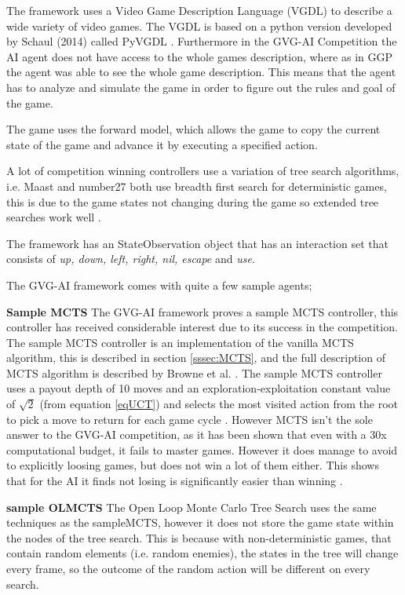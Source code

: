 \documentclass[journal]{IEEEtran}
\begin{document}
		
		The framework uses a Video Game Description Language (VGDL) to describe a wide variety of video games. The VGDL is based on a python version developed by Schaul (2014) called PyVGDL \cite{schuster2015mcts}. Furthermore in the GVG-AI Competition the AI agent does not have access to the whole games description, where as in GGP the agent was able to see the whole game description. This means that the agent has to analyze and simulate the game in order to figure out the rules and goal of the game.

The game uses the forward model, which allows the game to copy the current state of the game and advance it by executing a specified action.

A lot of competition winning controllers use a variation of tree search algorithms, i.e. Maast and number27  \cite{schuster2015mcts} both use breadth first search for deterministic games, this is due to the game states not changing during the game so extended tree searches work well \cite{perez2018general}.
		
		The framework has an StateObservation object that has an interaction set that consists of \textit{up, down, left, right, nil, escape} and \textit{use}.

		The GVG-AI framework comes with quite a few sample agents;
		
		\textbf{Sample MCTS} \label{sssec:sampleMCTS}
			The GVG-AI framework proves a sample MCTS controller, this controller has received considerable interest due to its success in the competition. 
			The sample MCTS controller is an implementation of the vanilla MCTS algorithm, this is described in section \ref{sssec:MCTS}, and the full description of MCTS algorithm is described by Browne et al. \cite{browne2012survey}.
			The sample MCTS controller uses a payout depth of 10 moves and an exploration-exploitation constant value of $\sqrt{2}$ (from equation \ref{eqUCT}) and selects the most visited action from the root to pick a move to return for each game cycle \cite{perez20162014}.
			However MCTS isn't the sole answer to the GVG-AI competition, as it has been shown that even with a 30x computational budget, it fails to master games. However it does manage to avoid to explicitly loosing games, but does not win a lot of them either. This shows that for the AI it finds not losing is significantly easier than winning \cite{nelson2016investigating}.
			
		\textbf{sample OLMCTS} \label{sssec:sampleOLMCTS}
			The Open Loop Monte Carlo Tree Search uses the same techniques as the sampleMCTS, however it does not store the game state within the nodes of the tree search. 
			This is because with non-deterministic games, that contain random elements (i.e. random enemies), the states in the tree will change every frame, so the outcome of the random action will be different on every search.
			
\end{document}
